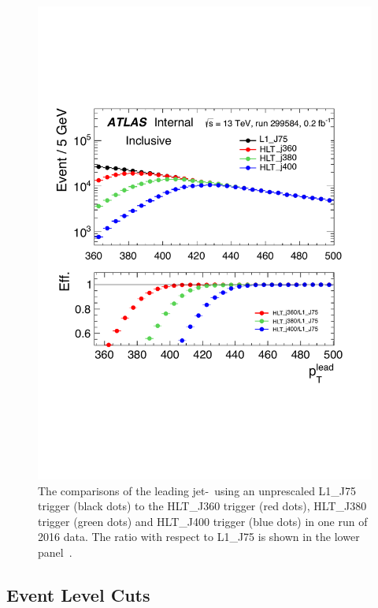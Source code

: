 \begin{figure}[!ht]
  \begin{center}
    \includegraphics[width=0.8\linewidth, angle=0]{figs/Dibjet/ICHEP/evt-jet_pt.pdf}
  \end{center}
\caption[The comparisons of the leading jet-\pT~using unprescaled L1\_J75 trigger (black dots) to the HLT\_J360 trigger (red dots),
  HLT\_J380 trigger (green dots) and HLT\_J400 trigger (blue dots) in one run of 2016 data.
  The ratio with respect to L1\_J75 is shown in the lower panel.]
        {The comparisons of the leading jet-\pT~using an unprescaled L1\_J75 trigger (black dots) to the HLT\_J360 trigger (red dots),
          HLT\_J380 trigger (green dots) and HLT\_J400 trigger (blue dots) in one run of 2016 data.
          The ratio with respect to L1\_J75 is shown in the lower panel~\cite{dibjet-ichep_conf}.}
  \label{fig:evt-jet_pt}
\end{figure}

\subsection{Event Level Cuts}
\label{sec:evt-sel-event}

